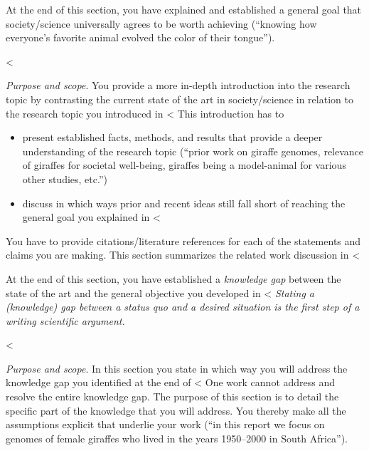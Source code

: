 {{{At the end of this section, you have explained and established a general goal that society/science universally agrees to be worth achieving (``knowing how everyone's favorite animal evolved the color of their tongue'').

<%

\emph{Purpose and scope}.
You provide a more in-depth introduction into the research topic by contrasting the current state of the art in society/science in relation to the research topic you introduced in <%
This introduction has to

\begin{itemize}
  \item present established facts, methods, and results that provide a deeper understanding of the research topic (``prior work on giraffe genomes, relevance of giraffes for societal well-being, giraffes being a model-animal for various other studies, etc.'')
  \item discuss in which ways prior and recent ideas still fall short of reaching the general goal you explained in <%
\end{itemize}

You have to provide citations/literature references for each of the statements and claims you are making.
This section summarizes the related work discussion in <%

At the end of this section, you have established a \emph{knowledge gap} between the state of the art and the general objective you developed in <%
\emph{Stating a (knowledge) gap between a status quo and a desired situation is the \emph{first step} of a writing scientific argument.}

<%

\emph{Purpose and scope}.
In this section you state in which way you will address the knowledge gap you identified at the end of <%
One work cannot address and resolve the entire knowledge gap.
The purpose of this section is to detail the specific part of the knowledge that you will address.
You thereby make all the assumptions explicit that underlie your work (``in this report we focus on genomes of female giraffes who lived in the years 1950--2000 in South Africa'').

}}}

